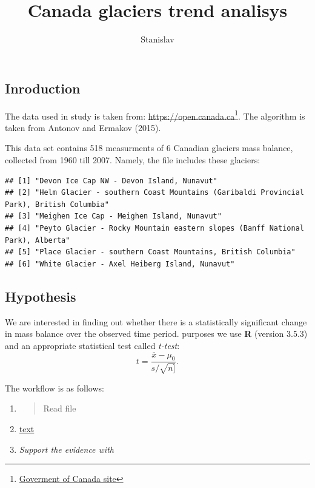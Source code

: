 \documentclass[]{article}
\title{Canada glaciers trend analisys}
\author{Stanislav}
\date{}
\let\rmarkdownfootnote\footnote%
\def\footnote{\protect\rmarkdownfootnote}
\begin{document}
\maketitle

{
\hypersetup{linkcolor=black}
\setcounter{tocdepth}{2}
\tableofcontents
}
\subsection{Inroduction}\label{inroduction}

The data used in study is taken from:
\url{https://open.canada.ca}\footnote{\href{https://open.canada.ca/data/en/dataset/aca5e1de-c234-5372-b714-ae20300fb6ce}{Goverment
  of Canada site}}. The algorithm is taken from Antonov and Ermakov
(2015).

This data set contains 518 measurments of 6 Canadian glaciers mass
balance, collected from 1960 till 2007. Namely, the file includes these
glaciers:

\begin{verbatim}
## [1] "Devon Ice Cap NW - Devon Island, Nunavut"                                             
## [2] "Helm Glacier - southern Coast Mountains (Garibaldi Provincial Park), British Columbia"
## [3] "Meighen Ice Cap - Meighen Island, Nunavut"                                            
## [4] "Peyto Glacier - Rocky Mountain eastern slopes (Banff National Park), Alberta"         
## [5] "Place Glacier - southern Coast Mountains, British Columbia"                           
## [6] "White Glacier - Axel Heiberg Island, Nunavut"
\end{verbatim}

\subsection{Hypothesis}\label{hypothesis}

We are interested in finding out whether there is a statistically
significant change in mass balance over the observed time period.
purposes we use \textbf{R} (version 3.5.3) and an appropriate
statistical test called \emph{t-test}:
\[t = \frac{\overline{x} - \mu_0}{s/\sqrt{n]}}.\]

The workflow is as follows:

\begin{enumerate}
\def\labelenumi{\arabic{enumi}.}
\item
  \begin{quote}
  Read file
  \end{quote}
\item
  \href{Run\%20t-test\%20for\%20each\%20glacier\%20and\%20collect\%20p-values}{text}
\item
  \emph{Support the evidence with}
\end{enumerate}
\end{document}
